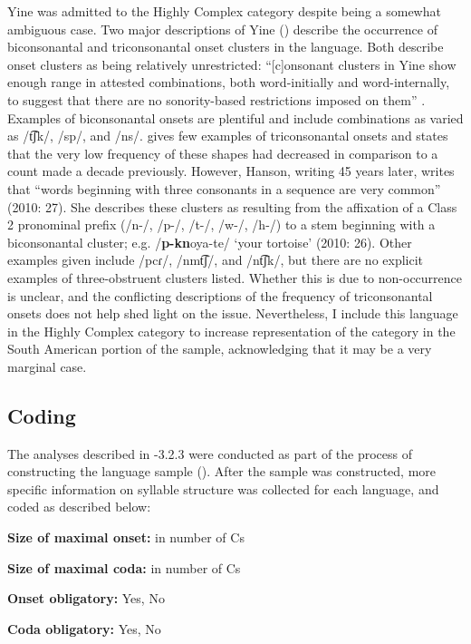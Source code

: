   Yine was admitted to the Highly Complex category despite being a somewhat ambiguous case. Two major descriptions of Yine (\citealt{Hanson2010,Matteson1965}) describe the occurrence of biconsonantal and triconsonantal onset clusters in the language. Both describe onset clusters as being relatively unrestricted: “[c]onsonant clusters in Yine show enough range in attested combinations, both word-initially and word-internally, to suggest that there are no sonority-based restrictions imposed on them” \citep[27]{Hanson2010}. Examples of biconsonantal onsets are plentiful and include combinations as varied as /t͡ʃk/, /sp/, and /ns/. \citet[24]{Matteson1965} gives few examples of triconsonantal onsets and states that the very low frequency of these shapes had decreased in comparison to a count made a decade previously. However, Hanson, writing 45 years later, writes that “words beginning with three consonants in a sequence are very common” (2010: 27). She describes these clusters as resulting from the affixation of a Class 2 pronominal prefix (/n-/, /p-/, /t-/, /w-/, /h-/) to a stem beginning with a biconsonantal cluster; e.g. /\textbf{p-kn}oya-te/ ‘your tortoise’ (2010: 26). Other examples given include /pcɾ/, /nmt͡ʃ/, and /nt͡ʃk/, but there are no explicit examples of three-obstruent clusters listed. Whether this is due to non-occurrence is unclear, and the conflicting descriptions of the frequency of triconsonantal onsets does not help shed light on the issue. Nevertheless, I include this language in the Highly Complex category to increase representation of the category in the South American portion of the sample, acknowledging that it may be a very marginal case.

\subsection{Coding}\label{sec:3.2.4}

  The analyses described in -3.2.3 were conducted as part of the process of constructing the language sample (). After the sample was constructed, more specific information on syllable structure was collected for each language, and coded as described below:

\textbf{Size of maximal onset:} in number of Cs

\textbf{Size of maximal coda:} in number of Cs

\textbf{Onset obligatory:} Yes, No

\textbf{Coda obligatory:} Yes, No

